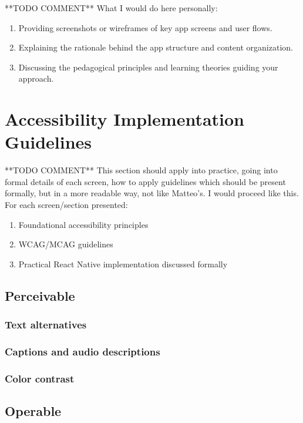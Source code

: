 **TODO COMMENT** What I would do here personally:

\begin{enumerate}
    \item Providing screenshots or wireframes of key app screens and user flows.
    \item Explaining the rationale behind the app structure and content organization.
    \item Discussing the pedagogical principles and learning theories guiding your approach.
\end{enumerate}

\section{Accessibility Implementation Guidelines}
\label{sec:implementation-guidelines}

**TODO COMMENT** This section should apply into practice, going into formal details of each screen, how to apply guidelines which should be present formally, but in a more readable way, not like Matteo's. I would proceed like this. For each screen/section presented:

\begin{enumerate}
    \item Foundational accessibility principles
    \item WCAG/MCAG guidelines
    \item Practical React Native implementation discussed formally
\end{enumerate}

\subsection{Perceivable}

\subsubsection{Text alternatives}

\subsubsection{Captions and audio descriptions}

\subsubsection{Color contrast}

\subsection{Operable}

